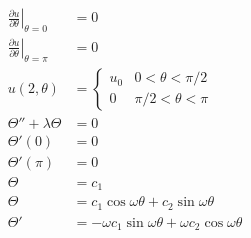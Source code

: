\documentclass{article}
\begin{document}
\begin{align*}
  \left. \frac{\partial u}{\partial \theta} \right|_{\theta = 0}   & = 0                                                                                                                                 \\
  \left. \frac{\partial u}{\partial \theta} \right|_{\theta = \pi} & = 0                                                                                                                                 \\
  u(2, \theta)                                                     & = \begin{cases}
                                                                         u_0 & 0 < \theta < \pi / 2   \\
                                                                         0   & \pi / 2 < \theta < \pi
                                                                       \end{cases}                                                                                                      \\
  \Theta'' + \lambda \Theta                                        & = 0                                                                                                                                 \\
  \Theta'(0)                                                       & = 0                                                                                                                                 \\
  \Theta'(\pi)                                                     & = 0                                                                                                                                 \\
  \Theta                                                           & = c_1                                                                                                                               \\
  \Theta                                                           & = c_1 \cos \omega \theta + c_2 \sin \omega \theta                                                                                   \\
  \Theta'                                                          & = -\omega c_1 \sin \omega \theta + \omega c_2 \cos \omega \theta                                                                    \\

\end{align*}
\end{document}
